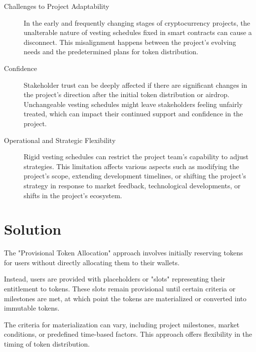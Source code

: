 \documentclass[12pt,oneside]{article}
\begin{document}
\begin{description}
  \item[Challenges to Project Adaptability]
  In the early and frequently changing stages of cryptocurrency projects, the unalterable nature 
  of vesting schedules fixed in smart contracts can cause a disconnect. This misalignment happens 
  between the project's evolving needs and the predetermined plans for token distribution.

  \item[Confidence]
  Stakeholder trust can be deeply affected if there are significant changes in the project's direction
  after the initial token distribution or airdrop. Unchangeable vesting schedules might leave stakeholders 
  feeling unfairly treated, which can impact their continued support and confidence in the project.

  \item[Operational and Strategic Flexibility]
  Rigid vesting schedules can restrict the project team's capability to adjust strategies. 
  This limitation affects various aspects such as modifying the project's scope, extending development 
  timelines, or shifting the project's strategy in response to market feedback, technological developments, 
  or shifts in the project's ecosystem.
\end{description}


\section{Solution}

The "Provisional Token Allocation" approach involves initially reserving tokens 
for users without directly allocating them to their wallets. 

Instead, users are provided with placeholders or "slots" representing their entitlement to tokens. 
These slots remain provisional until certain criteria or milestones are met, at which point 
the tokens are materialized or converted into immutable tokens. 

The criteria for materialization 
can vary, including project milestones, market conditions, or predefined time-based factors. 
This approach offers flexibility in the timing of token distribution.
\end{document}
